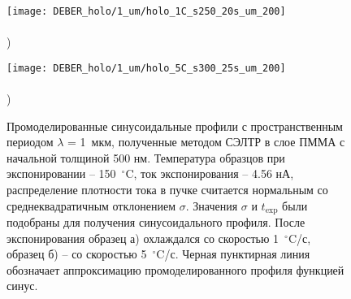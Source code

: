 \begin{figure}[t!]
	\begin{minipage}{0.48\textwidth}
		\texttt{[image: DEBER\_holo/1\_um/holo\_1C\_s250\_20s\_um\_200]} \\
		\vspace{-13em} \\ ) \\ \vspace{13em}
	\end{minipage}
	\begin{minipage}{0.48\textwidth}
		\texttt{[image: DEBER\_holo/1\_um/holo\_5C\_s300\_25s\_um\_200]} \\
		\vspace{-13em} \\ ) \\ \vspace{13em}
	\end{minipage}
	\vspace{-3em}
	\caption{Промоделированные синусоидальные профили с пространственным периодом $\lambda$ = 1~мкм, полученные методом СЭЛТР в слое ПММА с начальной толщиной 500 нм. Температура образцов при экспонировании -- 150~$^\circ$C, ток экспонирования -- 4.56 нА, распределение плотности тока в пучке считается нормальным со среднеквадратичным отклонением $\sigma$. Значения $\sigma$ и $t_\mathrm{exp}$ были подобраны для получения синусоидального профиля. После экспонирования образец а) охлаждался со скоростью 1~$^\circ$C/с, образец б) -- со скоростью 5~$^\circ$C/с. Черная пунктирная линия обозначает аппроксимацию промоделированного профиля функцией синус.}
	\label{fig:DEBER_holo_1um}
\end{figure}


